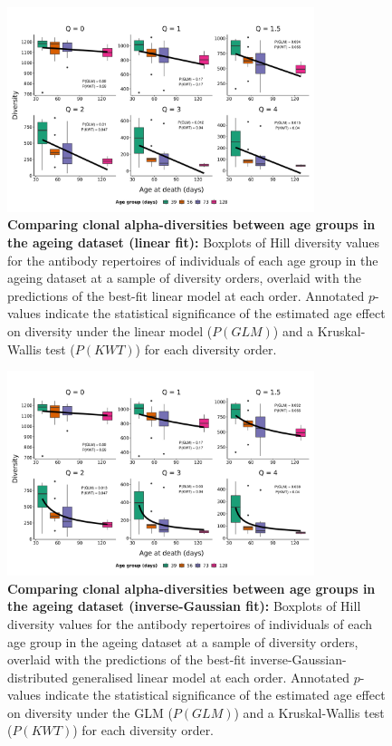 \begin{figure}
\centering
\includegraphics[width = 0.8\textwidth]{_Figures/png/ageing-clone-diversity-solo-fit-linear}
\caption[Comparing clonal alpha-diversities between age groups in the \igseq ageing dataset (linear fit)]{\textbf{Comparing clonal alpha-diversities between age groups in the \igseq ageing dataset (linear fit):} Boxplots of Hill diversity values for the antibody repertoires of individuals of each age group in the \igseq ageing dataset at a sample of diversity orders, overlaid with the predictions of the best-fit linear model at each order.  Annotated $p$-values indicate the statistical significance of the estimated age effect on diversity under the linear model ($P(GLM)$) and a Kruskal-Wallis test ($P(KWT)$) for each diversity order.}
\label{fig:igseq-ageing-clone-diversity-solo-fit-linear}
\end{figure}

\begin{figure}
\centering
\includegraphics[width = 0.8\textwidth]{_Figures/png/ageing-clone-diversity-solo-fit-igauss}
\caption[Comparing clonal alpha-diversities between age groups in the \igseq ageing dataset (inverse-Gaussian fit)]{\textbf{Comparing clonal alpha-diversities between age groups in the \igseq ageing dataset (inverse-Gaussian fit):} Boxplots of Hill diversity values for the antibody repertoires of individuals of each age group in the \igseq ageing dataset at a sample of diversity orders, overlaid with the predictions of the best-fit inverse-Gaussian-distributed generalised linear model at each order.  Annotated $p$-values indicate the statistical significance of the estimated age effect on diversity under the GLM ($P(GLM)$) and a Kruskal-Wallis test ($P(KWT)$) for each diversity order.}
\label{fig:igseq-ageing-clone-diversity-solo-fit-igauss}
\end{figure}


